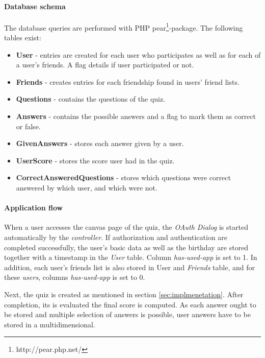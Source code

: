 \documentclass[preprint,12pt]{elsarticle}
\begin{document}
\paragraph{Database schema}
\label{sec:database-schema}
The database queries are performed with PHP
pear\footnote{http://pear.php.net/}-package. The following tables exist:
\begin{itemize}
\item \textbf{User} - entries are created for each user who participates as
well as for each of a user's friends. A flag details if user
participated or not.
\item \textbf{Friends} - creates entries for each friendship found in
users' friend lists.
\item \textbf{Questions} - contains the questions of the quiz.
\item \textbf{Answers} - contains the possible answers and a flag to mark them
as correct or false.
\item \textbf{GivenAnswers} - stores each answer given by a user.
\item \textbf{UserScore} - stores the score user had in the quiz.
\item \textbf{CorrectAnsweredQuestions} - stores which questions were correct
answered by which user, and which were not.
\end{itemize}

\paragraph{Application flow}
\label{sec:application-flow}
When a user accesses the canvas page of the quiz, 
the \textit{OAuth Dialog} is started automatically by the
\textit{controller}. If authorization and authentication are completed
successfully, the user's basic data as well as the birthday are stored together with
a timestamp in the \textit{User} table. Column \textit{has-used-app} is set to 1. In
addition, each user's friends list is also stored in \textup{User} and
\textit{Friends} table, and for these \textit{users}, columns
\textit{has-used-app} is set to 0. 

Next, the quiz is created as mentioned in section
\ref{sec:implmenetation}.
After completion, its is evaluated the final score is computed. As
each answer ought to be stored and multiple selection of answers is
possible, user answers have to be stored in  a multidimensional. 
\end{document}
